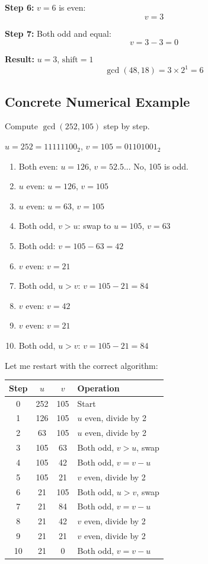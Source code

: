 \documentclass[12pt,a4paper]{article}
\theoremstyle{definition}
\begin{document}
\textbf{Step 6:} $v = 6$ is even:
\[v = 3\]

\textbf{Step 7:} Both odd and equal:
\[v = 3 - 3 = 0\]

\textbf{Result:} $u = 3$, $\text{shift} = 1$
\[\gcd(48, 18) = 3 \times 2^1 = 6\]

\subsection{Concrete Numerical Example}

Compute $\gcd(252, 105)$ step by step.

$u = 252 = 11111100_2$, $v = 105 = 01101001_2$

\begin{enumerate}
    \item Both even: $u = 126$, $v = 52.5$... No, 105 is odd.
    \item $u$ even: $u = 126$, $v = 105$
    \item $u$ even: $u = 63$, $v = 105$  
    \item Both odd, $v > u$: swap to $u = 105$, $v = 63$
    \item Both odd: $v = 105 - 63 = 42$
    \item $v$ even: $v = 21$
    \item Both odd, $u > v$: $v = 105 - 21 = 84$
    \item $v$ even: $v = 42$
    \item $v$ even: $v = 21$ 
    \item Both odd, $u > v$: $v = 105 - 21 = 84$
\end{enumerate}

Let me restart with the correct algorithm:

\begin{center}
\begin{tabular}{|c|c|c|l|}
\hline
Step & $u$ & $v$ & Operation \\
\hline
0 & 252 & 105 & Start \\
1 & 126 & 105 & $u$ even, divide by 2 \\
2 & 63 & 105 & $u$ even, divide by 2 \\
3 & 105 & 63 & Both odd, $v > u$, swap \\
4 & 105 & 42 & Both odd, $v = v - u$ \\
5 & 105 & 21 & $v$ even, divide by 2 \\
6 & 21 & 105 & Both odd, $u > v$, swap \\
7 & 21 & 84 & Both odd, $v = v - u$ \\
8 & 21 & 42 & $v$ even, divide by 2 \\
9 & 21 & 21 & $v$ even, divide by 2 \\
10 & 21 & 0 & Both odd, $v = v - u$ \\
\hline
\end{tabular}
\end{center}
\end{document}

